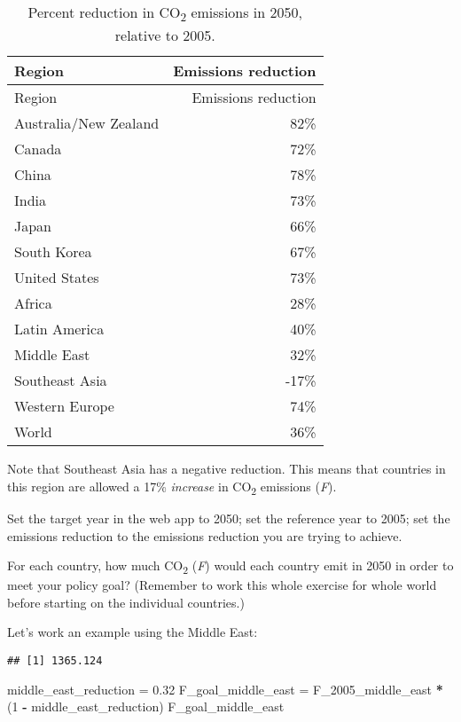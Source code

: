 \documentclass[
]{article}
\newenvironment{Shaded}{\begin{snugshade}}{\end{snugshade}}
\newcommand{\DecValTok}[1]{\textcolor[rgb]{0.00,0.00,0.81}{#1}}
\newcommand{\FloatTok}[1]{\textcolor[rgb]{0.00,0.00,0.81}{#1}}
\newcommand{\KeywordTok}[1]{\textcolor[rgb]{0.13,0.29,0.53}{\textbf{#1}}}
\newcommand{\NormalTok}[1]{#1}
\newcommand{\OperatorTok}[1]{\textcolor[rgb]{0.81,0.36,0.00}{\textbf{#1}}}
\newcommand{\StringTok}[1]{\textcolor[rgb]{0.31,0.60,0.02}{#1}}
\begin{document}
\begin{enumerate}
  \begin{longtable}[]{@{}lr@{}}
  \caption{Percent reduction in CO\textsubscript{2} emissions in 2050,
  relative to 2005.}\tabularnewline
  \toprule
  Region & Emissions reduction\tabularnewline
  \midrule
  \endfirsthead
  \toprule
  Region & Emissions reduction\tabularnewline
  \midrule
  \endhead
  Australia/New Zealand & 82\%\tabularnewline
  Canada & 72\%\tabularnewline
  China & 78\%\tabularnewline
  India & 73\%\tabularnewline
  Japan & 66\%\tabularnewline
  South Korea & 67\%\tabularnewline
  United States & 73\%\tabularnewline
  Africa & 28\%\tabularnewline
  Latin America & 40\%\tabularnewline
  Middle East & 32\%\tabularnewline
  Southeast Asia & -17\%\tabularnewline
  Western Europe & 74\%\tabularnewline
  World & 36\%\tabularnewline
  \bottomrule
  \end{longtable}

  Note that Southeast Asia has a negative reduction. This means that
  countries in this region are allowed a 17\% \emph{increase} in
  CO\textsubscript{2} emissions (\emph{F}).

  Set the target year in the web app to 2050; set the reference year to
  2005; set the emissions reduction to the emissions reduction you are
  trying to achieve.

  For each country, how much CO\textsubscript{2} (\emph{F}) would each
  country emit in 2050 in order to meet your policy goal? (Remember to
  work this whole exercise for whole world before starting on the
  individual countries.)

  Let's work an example using the Middle East:

\begin{Shaded}
\end{Shaded}

\begin{verbatim}
## [1] 1365.124
\end{verbatim}

\begin{Shaded}
\begin{Highlighting}[]
\NormalTok{middle\_east\_reduction =}\StringTok{ }\FloatTok{0.32}
\NormalTok{F\_goal\_middle\_east =}\StringTok{ }\NormalTok{F\_}\DecValTok{2005}\NormalTok{\_middle\_east }\OperatorTok{*}\StringTok{ }\NormalTok{(}\DecValTok{1} \OperatorTok{{-}}\StringTok{ }\NormalTok{middle\_east\_reduction)}
\NormalTok{F\_goal\_middle\_east}
\end{Highlighting}
\end{Shaded}


\end{enumerate}
\end{document}
